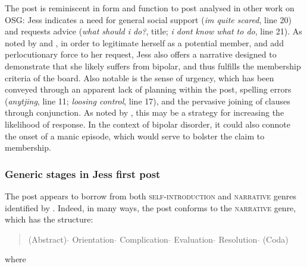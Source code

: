 \documentclass{article}
\begin{document}
{The post is reminiscent in form and function to post analysed in other work on OSG: Jess indicates a need for general social support (\emph{im quite scared}, line 20) and requests advice (\emph{what should i do?}, title; \emph{i dont know what to do}, line 21). As noted by \textcite{smithson_developing_2012} and \textcite{varga2014grieving}, in order to legitimate herself as a potential member, and add perlocutionary force to her request, Jess also offers a narrative designed to demonstrate that she likely suffers from bipolar, and thus fulfills the membership criteria of the board. Also notable is the sense of urgency, which has been conveyed through an apparent lack of planning within the post, spelling errors (\emph{anytjing}, line 11; \emph{loosing control}, line 17), and the pervasive joining of clauses through conjunction. As noted by \textcite{horne_doing_2009}, this may be a strategy for increasing the likelihood of response. In the context of bipolar disorder, it could also connote the onset of a manic episode, which would serve to bolster the claim to membership.

\subsubsection{Generic stages in Jess first post}

The post appears to borrow from both \textsc{self-introduction} and \textsc{narrative} genres identified by \textcite{labov_narrative_1997}. Indeed, in many ways, the post conforms to the \textsc{narrative} genre, which has the structure:

\begin{quote}
(Abstract) $\hat{}$ Orientation $\hat{}$ Complication $\hat{}$ Evaluation $\hat{}$ Resolution $\hat{}$ (Coda)
\end{quote}

\noindent where

}
\end{document}
